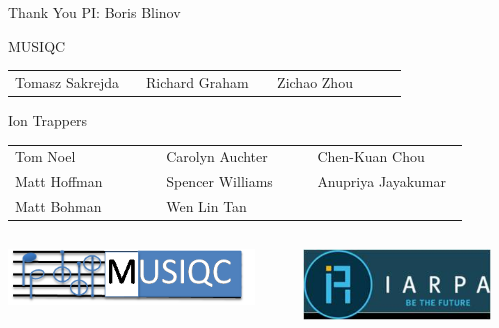 \documentclass{beamer}
\begin{document}
\begin{frame}{Thank You}
\centering
PI: Boris Blinov
\begin{block}{MUSIQC}
\begin{tabular*}{0.9\textwidth}{p{0.3\linewidth} p{0.3\linewidth} p{0.3\linewidth}}
Tomasz Sakrejda & Richard Graham & Zichao Zhou \\
\end{tabular*}
\end{block}

\begin{block}{Ion Trappers}
\begin{tabular*}{0.9\textwidth}{p{0.3\linewidth} p{0.3\linewidth} p{0.3\linewidth}}
Tom Noel & Carolyn Auchter & Chen-Kuan Chou \\
Matt Hoffman & Spencer Williams & Anupriya Jayakumar \\
Matt Bohman & Wen Lin Tan
\end{tabular*}
\end{block}

\begin{columns}
\begin{column}{0.5\textwidth}
	\includegraphics[width=0.9\textwidth]{musiqc_logo}
\end{column}
\begin{column}{0.5\textwidth}
	\includegraphics[width=0.9\textwidth]{iarpa}
\end{column}
\end{columns}
\end{frame}
\end{document}
